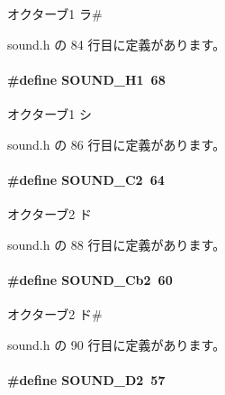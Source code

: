 オクターブ1 ラ\# 



 sound.\+h の 84 行目に定義があります。

\paragraph[{S\+O\+U\+N\+D\+\_\+\+H1}]{\setlength{\rightskip}{0pt plus 5cm}\#define S\+O\+U\+N\+D\+\_\+\+H1~68}\label{sound_8h_a779cc45580fd31304c432b2582e94953_a779cc45580fd31304c432b2582e94953}


オクターブ1 シ 



 sound.\+h の 86 行目に定義があります。

\paragraph[{S\+O\+U\+N\+D\+\_\+\+C2}]{\setlength{\rightskip}{0pt plus 5cm}\#define S\+O\+U\+N\+D\+\_\+\+C2~64}\label{sound_8h_a041d01c58025c9f74835d33da716e51d_a041d01c58025c9f74835d33da716e51d}


オクターブ2 ド 



 sound.\+h の 88 行目に定義があります。

\paragraph[{S\+O\+U\+N\+D\+\_\+\+Cb2}]{\setlength{\rightskip}{0pt plus 5cm}\#define S\+O\+U\+N\+D\+\_\+\+Cb2~60}\label{sound_8h_a2ea86474bf4acd9fa0b6cc36610a54db_a2ea86474bf4acd9fa0b6cc36610a54db}


オクターブ2 ド\# 



 sound.\+h の 90 行目に定義があります。

\paragraph[{S\+O\+U\+N\+D\+\_\+\+D2}]{\setlength{\rightskip}{0pt plus 5cm}\#define S\+O\+U\+N\+D\+\_\+\+D2~57}\label{sound_8h_a24efb33152ca6f7c832a646cefc86f32_a24efb33152ca6f7c832a646cefc86f32}


